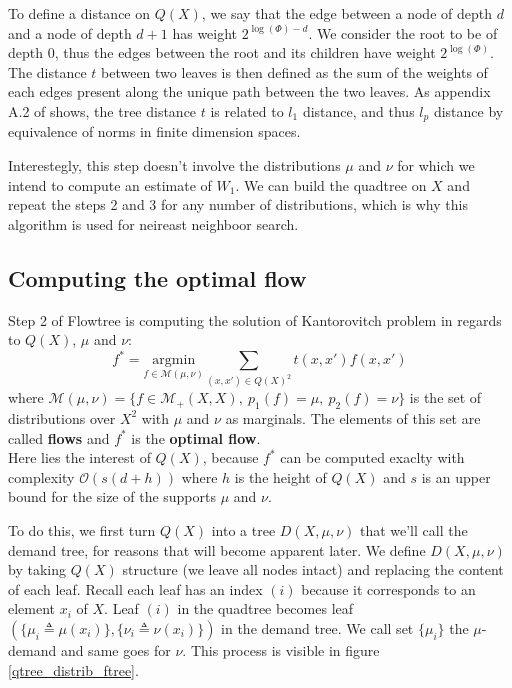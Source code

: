 \documentclass[11pt]{article}
\begin{document}
To define a distance on $Q(X)$, we say that the edge between a node of depth $d$ and a node of depth $d+1$ has weight $2^{\log(\Phi)-d}$. We consider the root to be of depth $0$, thus the edges between the root and its children have weight $2^{\log(\Phi)}$. The distance $t$ between two leaves is then defined as the sum of the weights of each edges present along the unique path between the two leaves. As appendix A.2 of \cite{Flowtree} shows, the tree distance $t$ is related to $l_1$ distance, and thus $l_p$ distance by equivalence of norms in finite dimension spaces.

Interestegly, this step doesn't involve the distributions $\mu$ and $\nu$ for which we intend to compute an estimate of $W_1$. We can build the quadtree on $X$ and repeat the steps 2 and 3 for any number of distributions, which is why this algorithm is used for neireast neighboor search. 

\subsection{Computing the optimal flow} \label{ssec:computing_optimal_flow}
Step 2 of Flowtree is computing the solution of Kantorovitch problem in regards to $Q(X)$, $\mu$ and $\nu$:
$$
f^* = \underset{f \in \mathcal{M}(\mu, \nu)}{\text{argmin}} \sum_{(x, x') \in Q(X)^2} t(x, x') f(x, x')
$$
where $\mathcal{M}(\mu, \nu) = \lbrace f \in \mathcal{M}_+(X, X),~ p_1(f) = \mu,~ p_2(f) = \nu \rbrace$ is the set of distributions over $X^2$ with $\mu$ and $\nu$ as marginals. The elements of this set are called \textbf{flows} and $f^*$ is the \textbf{optimal flow}.\\
Here lies the interest of $Q(X)$, because $f^*$ can be computed exaclty with complexity $\mathcal{O}(s(d+h))$ where $h$ is the height of $Q(X)$ and $s$ is an upper bound for the size of the supports $\mu$ and $\nu$.

To do this, we first turn $Q(X)$ into a tree $D(X, \mu, \nu)$ that we'll call the demand tree, for reasons that will become apparent later. We define $D(X, \mu, \nu)$ by taking $Q(X)$ structure (we leave all nodes intact) and replacing the content of each leaf. Recall each leaf has an index $(i)$ because it corresponds to an element $x_i$ of $X$. Leaf $(i)$ in the quadtree becomes leaf 
$( \lbrace \mu_i \triangleq \mu(x_i) \rbrace , \lbrace \nu_i \triangleq \nu(x_i) \rbrace )$ 
in the demand tree. We call set $\lbrace \mu_i \rbrace$ the $\mu$-demand and same goes for $\nu$. This process is visible in figure \ref{qtree_distrib_ftree}.
\end{document}
